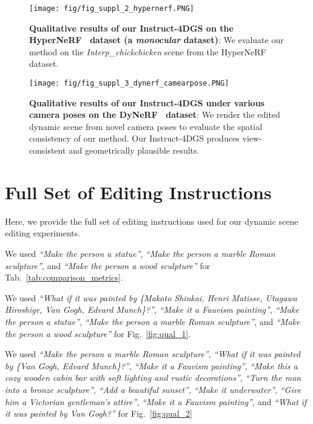 \begin{figure*}[!t]
\centering
    \texttt{[image: fig/fig\_suppl\_2\_hypernerf.PNG]}
    \caption{\textbf{Qualitative results of our Instruct-4DGS on the HyperNeRF~\cite{ref_73_hypernerf} dataset (a \emph{monocular} dataset)}: We evaluate our method on the \emph{Interp\_chickchicken} scene from the HyperNeRF dataset.}
    \label{fig:suppl_hypernerf}
\end{figure*}


\begin{figure*}[t]
\centering
    \texttt{[image: fig/fig\_suppl\_3\_dynerf\_camearpose.PNG]}
    \caption{\textbf{Qualitative results of our Instruct-4DGS under various camera poses on the DyNeRF~\cite{ref_37_neural3dvideo} dataset}: We render the edited dynamic scene from novel camera poses to evaluate the spatial consistency of our method. Our Instruct-4DGS produces view-consistent and geometrically plausible results.}
    \label{fig:suppl_dynerf}
\end{figure*}


\section{Full Set of Editing Instructions}
Here, we provide the full set of editing instructions used for our dynamic scene editing experiments.

We used \emph{``Make the person a statue''}, \emph{``Make the person a marble Roman sculpture''}, and \emph{``Make the person a wood sculpture''} for Tab.~\ref{tab:comparison_metrics}.

We used \emph{``What if it was painted by \{Makoto Shinkai, Henri Matisse, Utagawa Hiroshige, Van Gogh, Edvard Munch\}?''}, \emph{``Make it a Fauvism painting''}, \emph{``Make the person a statue''}, \emph{``Make the person a marble Roman sculpture''}, and \emph{``Make the person a wood sculpture''} for Fig.~\ref{fig:qual_1}.

We used \emph{``Make the person a marble Roman sculpture''}, \emph{``What if it was painted by \{Van Gogh, Edvard Munch\}?''}, \emph{``Make it a Fauvism painting''}, \emph{``Make this a cozy wooden cabin bar with soft lighting and rustic decorations''}, \emph{``Turn the man into a bronze sculpture''}, \emph{``Add a beautiful sunset''}, \emph{``Make it underwater''}, \emph{``Give him a Victorian gentleman’s attire''}, \emph{``Make it a Fauvism painting''}, and \emph{``What if it was painted by Van Gogh?''} for Fig.~\ref{fig:qual_2}